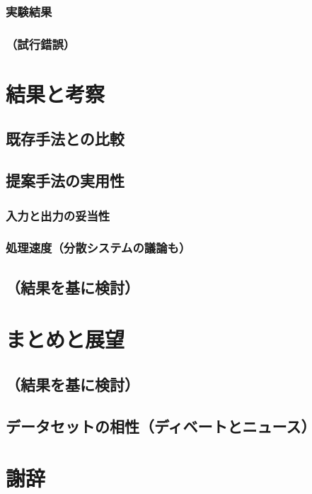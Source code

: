 \documentclass[12pt,a4j]{jreport}
\begin{document}
    \subsection{実験結果}
    \subsection{（試行錯誤）}

\chapter{結果と考察}

\section{既存手法との比較}
\section{提案手法の実用性}
    \subsection{入力と出力の妥当性}
    \subsection{処理速度（分散システムの議論も）}
\section{（結果を基に検討）}


\chapter{まとめと展望}

\section{（結果を基に検討）}
\section{データセットの相性（ディベートとニュース）}


\chapter*{謝辞}




\end{document}
